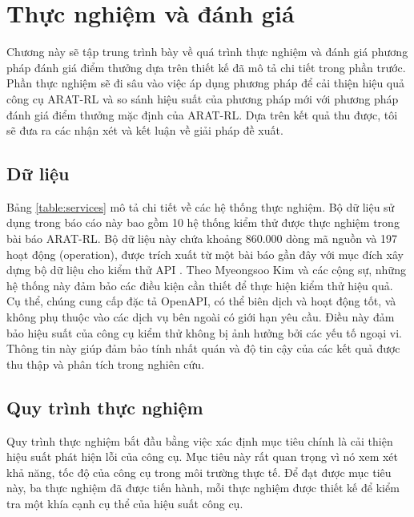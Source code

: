 \chapter{Thực nghiệm và đánh giá}
\label{chap:experiment}
Chương này sẽ tập trung trình bày về quá trình thực nghiệm và đánh giá phương pháp đánh giá điểm thưởng dựa trên thiết kế đã mô tả chi tiết trong phần trước. Phần thực nghiệm sẽ đi sâu vào việc áp dụng phương pháp để cải thiện hiệu quả công cụ ARAT-RL và so sánh hiệu suất của phương pháp mới với phương pháp đánh giá điểm thưởng mặc định của ARAT-RL. Dựa trên kết quả thu được, tôi sẽ đưa ra các nhận xét và kết luận về giải pháp đề xuất.








\section{Dữ liệu}

Bảng \ref{table:services} mô tả chi tiết về các hệ thống thực nghiệm. Bộ dữ liệu sử dụng trong báo cáo này bao gồm 10 hệ thống kiểm thử được thực nghiệm trong bài báo ARAT-RL. Bộ dữ liệu này chứa khoảng 860.000 dòng mã nguồn và 197 hoạt động (operation), được trích xuất từ một bài báo gần đây với mục đích xây dựng bộ dữ liệu cho kiểm thử API \cite{10.1145/3533767.3534401}. Theo Myeongsoo Kim và các cộng sự, những hệ thống này đảm bảo các điều kiện cần thiết để thực hiện kiểm thử hiệu quả. Cụ thể, chúng cung cấp đặc tả OpenAPI, có thể biên dịch và hoạt động tốt, và không phụ thuộc vào các dịch vụ bên ngoài có giới hạn yêu cầu. Điều này đảm bảo hiệu suất của công cụ kiểm thử không bị ảnh hưởng bởi các yếu tố ngoại vi. Thông tin này giúp đảm bảo tính nhất quán và độ tin cậy của các kết quả được thu thập và phân tích trong nghiên cứu.





\section{Quy trình thực nghiệm}
Quy trình thực nghiệm bắt đầu bằng việc xác định mục tiêu chính là cải thiện hiệu suất phát hiện lỗi của công cụ. Mục tiêu này rất quan trọng vì nó xem xét khả năng, tốc độ của công cụ trong môi trường thực tế. Để đạt được mục tiêu này, ba thực nghiệm đã được tiến hành, mỗi thực nghiệm được thiết kế để kiểm tra một khía cạnh cụ thể của hiệu suất công cụ.

